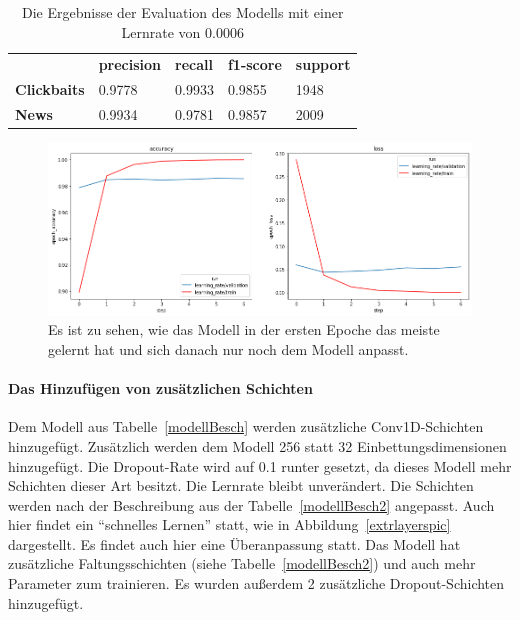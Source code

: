 \begin{table}[h]
    \caption{Die Ergebnisse der Evaluation des Modells mit einer Lernrate von 0.0006}
    \label{evallearn}
    \renewcommand{\arraystretch}{1.2}
    \centering
    \sffamily
    \begin{footnotesize}
        \begin{tabular}{l l l l l}
            \toprule
                           & \textbf{precision} & \textbf{recall} & \textbf{f1-score} & \textbf{support} \\
            \textbf{Clickbaits} & 0.9778                 & 0.9933                 & 0.9855                & 1948          \\
            \textbf{News}  & 0.9934                 & 0.9781                & 0.9857               & 2009                     \\
            \bottomrule
        \end{tabular}
    \end{footnotesize}
    \rmfamily
\end{table}

\begin{figure}[H]
    \centering
    \includegraphics[width=15cm]{kapitel5/learningrate.png}
    \caption[Auswirkung der Lernrate]{Es ist zu sehen, wie das Modell in der ersten Epoche das meiste gelernt hat und sich danach nur noch dem Modell anpasst.}
    \label{learnpic}
\end{figure}

\paragraph{Das Hinzufügen von zusätzlichen Schichten}
Dem Modell aus Tabelle~\ref{modellBesch} werden zusätzliche Conv1D-Schichten hinzugefügt. Zusätzlich werden dem Modell 256 statt 32 Einbettungsdimensionen hinzugefügt. Die Dropout-Rate wird auf 0.1 runter gesetzt, da dieses Modell mehr Schichten dieser Art besitzt. Die Lernrate bleibt unverändert. Die Schichten werden nach der Beschreibung aus der Tabelle~\ref{modellBesch2} angepasst. Auch hier findet ein \enquote{schnelles Lernen} statt, wie in Abbildung~\ref{extrlayerspic} dargestellt. Es findet auch hier eine Überanpassung statt. Das Modell hat zusätzliche Faltungsschichten (siehe Tabelle~\ref{modellBesch2}) und auch mehr Parameter zum trainieren. Es wurden außerdem 2 zusätzliche Dropout-Schichten hinzugefügt.

